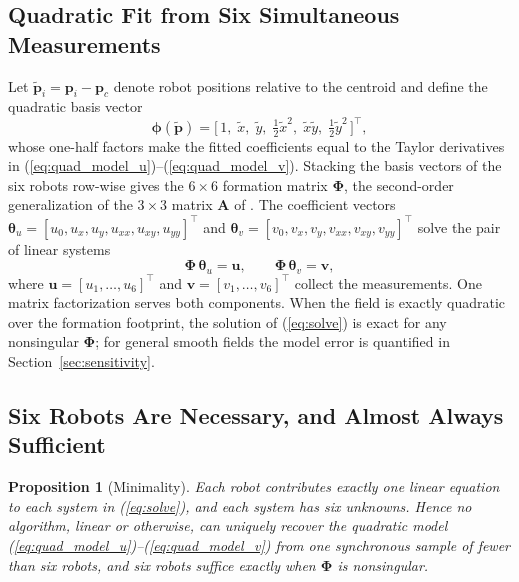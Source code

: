 \documentclass[lettersize,journal]{IEEEtran}
\newtheorem{proposition}{Proposition}
\begin{document}
\subsection{Quadratic Fit from Six Simultaneous Measurements}

Let $\tilde{\mathbf{p}}_i = \mathbf{p}_i - \mathbf{p}_c$ denote robot
positions relative to the centroid and define the quadratic basis vector
\begin{equation}
    \boldsymbol{\phi}(\tilde{\mathbf{p}}) =
    \bigl[\,1, \; \tilde{x}, \; \tilde{y}, \; \tfrac{1}{2}\tilde{x}^2, \;
    \tilde{x}\tilde{y}, \; \tfrac{1}{2}\tilde{y}^2\,\bigr]^\top,
    \label{eq:basis}
\end{equation}
whose one-half factors make the fitted coefficients equal to the Taylor
derivatives in (\ref{eq:quad_model_u})--(\ref{eq:quad_model_v}). Stacking
the basis vectors of the six robots row-wise gives the $6 \times 6$
formation matrix $\boldsymbol{\Phi}$, the second-order generalization of
the $3 \times 3$ matrix $\mathbf{A}$ of \cite{14}. The coefficient vectors
$\boldsymbol{\theta}_u = [u_0, u_x, u_y, u_{xx}, u_{xy}, u_{yy}]^\top$ and
$\boldsymbol{\theta}_v = [v_0, v_x, v_y, v_{xx}, v_{xy}, v_{yy}]^\top$
solve the pair of linear systems
\begin{equation}
    \boldsymbol{\Phi}\,\boldsymbol{\theta}_u = \mathbf{u}, \qquad
    \boldsymbol{\Phi}\,\boldsymbol{\theta}_v = \mathbf{v},
    \label{eq:solve}
\end{equation}
where $\mathbf{u} = [u_1, \ldots, u_6]^\top$ and $\mathbf{v} = [v_1,
\ldots, v_6]^\top$ collect the measurements. One matrix factorization
serves both components. When the field is exactly quadratic over the
formation footprint, the solution of (\ref{eq:solve}) is exact for any
nonsingular $\boldsymbol{\Phi}$; for general smooth fields the model
error is quantified in Section~\ref{sec:sensitivity}.

\subsection{Six Robots Are Necessary, and Almost Always Sufficient}

\begin{proposition}[Minimality]
\label{prop:minimality}
Each robot contributes exactly one linear equation to each system in
(\ref{eq:solve}), and each system has six unknowns. Hence no algorithm,
linear or otherwise, can uniquely recover the quadratic model
(\ref{eq:quad_model_u})--(\ref{eq:quad_model_v}) from one synchronous
sample of fewer than six robots, and six robots suffice exactly when
$\boldsymbol{\Phi}$ is nonsingular.
\end{proposition}
\end{document}
